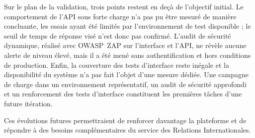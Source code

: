 Sur le plan de la validation, trois points restent en deçà de l'objectif initial. Le comportement de l'API sous forte charge n'a pas pu être mesuré de manière concluante, les essais ayant été limités par l'environnement de test disponible ; le seuil de temps de réponse visé n'est donc pas confirmé. L'audit de sécurité dynamique, réalisé avec OWASP~ZAP sur l'interface et l'API, ne révèle aucune alerte de niveau élevé, mais il a été mené sans authentification et hors conditions de production. Enfin, la couverture des tests d'interface reste inégale et la disponibilité du système n'a pas fait l'objet d'une mesure dédiée. Une campagne de charge dans un environnement représentatif, un audit de sécurité approfondi et un renforcement des tests d'interface constituent les premières tâches d'une future itération.

Ces évolutions futures permettraient de renforcer davantage la plateforme et de répondre à des besoins complémentaires du service des Relations Internationales.
